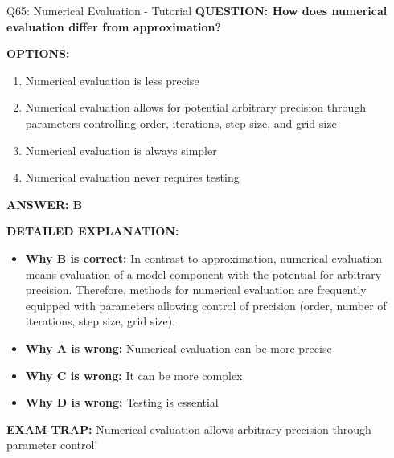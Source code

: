 \documentclass[8pt]{beamer}
\begin{document}
	\begin{frame}{Q65: Numerical Evaluation - Tutorial}
		\fontsize{6.5}{7.5}\selectfont
		\textbf{QUESTION: How does numerical evaluation differ from approximation?}
		
		\vspace{0.1cm}
		\textbf{OPTIONS:}
		\begin{enumerate}
			\item Numerical evaluation is less precise
			\item Numerical evaluation allows for potential arbitrary precision through parameters controlling order, iterations, step size, and grid size
			\item Numerical evaluation is always simpler
			\item Numerical evaluation never requires testing
		\end{enumerate}
		
		\vspace{0.1cm}
		\textcolor{myblue}{\textbf{ANSWER: B}}
		
		\vspace{0.1cm}
		\textbf{DETAILED EXPLANATION:}
		\begin{itemize}
			\item \textbf{Why B is correct:} In contrast to approximation, numerical evaluation means evaluation of a model component with the potential for arbitrary precision. Therefore, methods for numerical evaluation are frequently equipped with parameters allowing control of precision (order, number of iterations, step size, grid size).
			\item \textbf{Why A is wrong:} Numerical evaluation can be more precise
			\item \textbf{Why C is wrong:} It can be more complex
			\item \textbf{Why D is wrong:} Testing is essential
		\end{itemize}
		
		\textcolor{myred}{\textbf{EXAM TRAP:}} Numerical evaluation allows \textcolor{myblue}{arbitrary precision through parameter control}!
	\end{frame}
	
	
\end{document}
